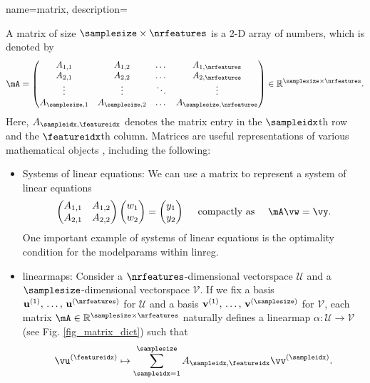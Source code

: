 {name={matrix},
	description={A matrix of size $\samplesize \times \nrfeatures$ is a 2-D array of numbers, 
 		which is denoted by 
		$$
  		\mA = \begin{pmatrix}
   		A_{1,1} & A_{1,2} & \dots  & A_{1,\nrfeatures} \\
		A_{2,1} & A_{2,2} & \dots  & A_{2,\nrfeatures} \\
		\vdots  & \vdots  & \ddots & \vdots \\
		A_{\samplesize,1} & A_{\samplesize,2} & \dots  & A_{\samplesize,\nrfeatures}
		\end{pmatrix} \in \mathbb{R}^{\samplesize \times \nrfeatures}.
		$$
		Here, $A_{\sampleidx,\featureidx}$ denotes the matrix entry in the $\sampleidx$th row and the 
		$\featureidx$th column. Matrices are useful representations of various mathematical objects \cite{StrangLinAlg2016},
		including the following:
		\begin{itemize}
			\item Systems of linear equations: We can use a matrix to represent a system of linear equations 
			$$ \begin{pmatrix}
			A_{1,1} & A_{1,2} \\
			A_{2,1} & A_{2,2}
			\end{pmatrix}
			\begin{pmatrix}
				w_1 \\
				w_2
			\end{pmatrix}
			=\begin{pmatrix}
				y_1 \\
				y_2
			\end{pmatrix}
			\quad \text{ compactly as } \quad \mA \vw = \vy.
			$$
    			One important example of systems of linear equations is the optimality condition for the 
    			\glspl{modelparam} within \gls{linreg}. 
			\item \Glspl{linearmap}:
			Consider a $\nrfeatures$-dimensional \gls{vectorspace} $\mathcal{U}$ and a $\samplesize$-dimensional \gls{vectorspace} $\mathcal{V}$. 
			If we fix a basis $\mathbf{u}^{(1)},\,\ldots,\,\mathbf{u}^{(\nrfeatures)}$ for $\mathcal{U}$ and a basis $\mathbf{v}^{(1)},\,\ldots,\,\mathbf{v}^{(\samplesize)}$ 
			for $\mathcal{V}$, each matrix $\mA \in \mathbb{R}^{\samplesize \times \nrfeatures}$ naturally defines a 
			\gls{linearmap} $\alpha: \mathcal{U} \rightarrow \mathcal{V}$ (see Fig. \ref{fig_matrix_dict}) such that
   			$$\vu^{(\featureidx)} \mapsto \sum_{\sampleidx=1}^{\samplesize} A_{\sampleidx,\featureidx} \vv^{(\sampleidx)}.$$

\end{itemize}}}
